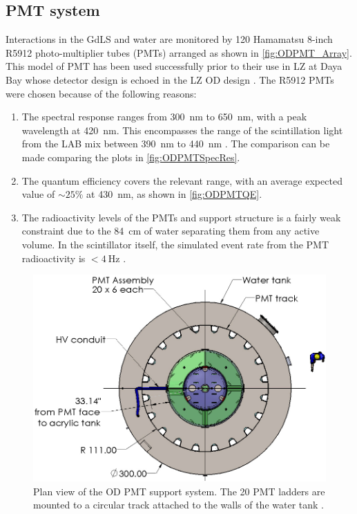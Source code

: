 \subsection{PMT system}
Interactions in the GdLS and water are monitored by 120 Hamamatsu 8-inch R5912 photo-multiplier tubes (PMTs) arranged as shown in \autoref{fig:ODPMT_Array}. 
This model of PMT has been used successfully prior to their use in LZ at Daya Bay whose detector design is echoed in the LZ OD design \cite{Cao:2016vwh}. The R5912 PMTs were chosen because of the following reasons:
\begin{enumerate} 
    \item The spectral response ranges from 300~nm to 650~nm, with a peak wavelength at 420~nm. This encompasses the range of the scintillation light from the LAB mix between 390~nm to 440~nm \cite{Haselschwardt:2018vmp}. The comparison can be made comparing the plots in \autoref{fig:ODPMTSpecRes}.
    \item The quantum efficiency covers the relevant range, with an average expected value of $\sim25\%$ at 430~nm, as shown in \autoref{fig:ODPMTQE}.
    \item The radioactivity levels of the PMTs and support structure is a fairly weak constraint due to the 84~cm of water separating them from any active volume. In the scintillator itself, the simulated event rate from the PMT radioactivity is $<4~\text{Hz}$ \cite{LZTDR}. 
\end{enumerate}
\begin{figure}[!ht]
    \centering
    \includegraphics[width=0.6\linewidth]{figures/LZ/OD_PMT_support.jpg}
    \caption{Plan view of the OD PMT support system. The 20 PMT ladders are mounted to a circular track attached to the walls of the water tank \cite{LZTDR}.}
    \label{fig:ODPMT_Array}
\end{figure}
